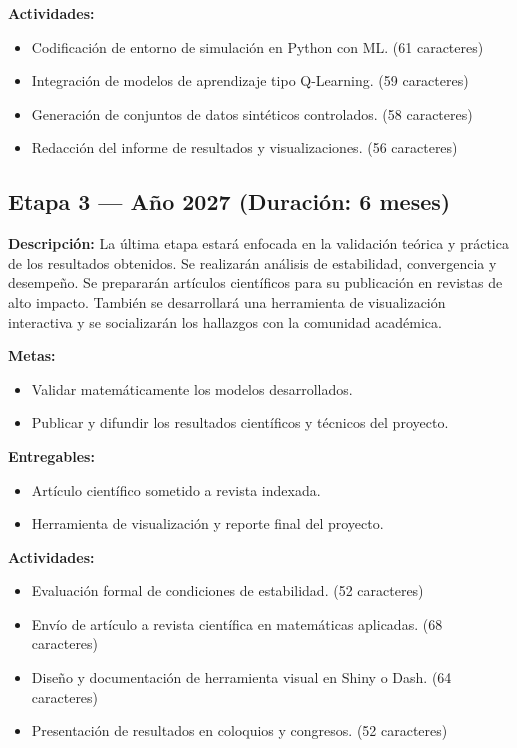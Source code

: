 \documentclass[12pt]{article}
\begin{document}
\textbf{Actividades:}
\begin{itemize}
  \item Codificación de entorno de simulación en Python con ML. (61 caracteres)
  \item Integración de modelos de aprendizaje tipo Q-Learning. (59 caracteres)
  \item Generación de conjuntos de datos sintéticos controlados. (58 caracteres)
  \item Redacción del informe de resultados y visualizaciones. (56 caracteres)
\end{itemize}

\subsection*{Etapa 3 — Año 2027 (Duración: 6 meses)}
\textbf{Descripción:} La última etapa estará enfocada en la validación teórica y práctica de los resultados obtenidos. Se realizarán análisis de estabilidad, convergencia y desempeño. Se prepararán artículos científicos para su publicación en revistas de alto impacto. También se desarrollará una herramienta de visualización interactiva y se socializarán los hallazgos con la comunidad académica.

\textbf{Metas:}
\begin{itemize}
  \item Validar matemáticamente los modelos desarrollados.
  \item Publicar y difundir los resultados científicos y técnicos del proyecto.
\end{itemize}

\textbf{Entregables:}
\begin{itemize}
  \item Artículo científico sometido a revista indexada.
  \item Herramienta de visualización y reporte final del proyecto.
\end{itemize}

\textbf{Actividades:}
\begin{itemize}
  \item Evaluación formal de condiciones de estabilidad. (52 caracteres)
  \item Envío de artículo a revista científica en matemáticas aplicadas. (68 caracteres)
  \item Diseño y documentación de herramienta visual en Shiny o Dash. (64 caracteres)
  \item Presentación de resultados en coloquios y congresos. (52 caracteres)
\end{itemize}
\end{document}
